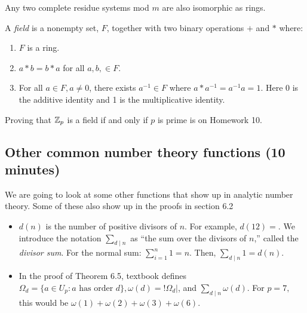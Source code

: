 \documentclass[letterpaper, 11 pt]{article}
\begin{document}
Any two complete residue systems mod $m$ are also isomorphic as rings.

\begin{defn}
 A \emph{field} is a nonempty set, $F$, together with two binary operations $+$ and $*$ where:
 
\begin{enumerate}
 \item $F$ is a ring.
 \item $a*b=b*a$ for all $a,b,\in F$. 
 \item For all $a\in F, a\neq 0$, there exists $a^{-1}\in F$ where $a*a^{-1}=a^{-1}a=1$. Here 0 is the additive identity and 1 is the multiplicative identity.
\end{enumerate}
 
\end{defn}

Proving that $\mathbb Z_p$ is a field if and only if $p$ is prime is on Homework 10.


\subsection{Other common number theory functions (10 minutes)}
We are going to look at some other functions that show up in analytic number theory. Some of these also show up in the proofs in section 6.2

\begin{itemize}
 \item $d(n)$ is the number of positive divisors of $n$. For example, $d(12)=  
 $. We introduce the notation $\displaystyle\sum_{d\mid n}$ as ``the sum over the divisors of $n$,'' called the \emph{divisor sum}. For the normal sum: $\displaystyle\sum_{i=1}^n 1= {n}
 $. Then, $\displaystyle\sum_{d\mid n}1= {d(n)}
$.
 
 \item In the proof of Theorem 6.5, textbook defines $\Omega_d=\{a\in U_p: a\textrm{ has order } d\}, \omega(d)=!\Omega_d|$, and $\displaystyle\sum_{d\mid n} \omega(d)$. For $p=7,$ this would be $\omega(1)+\omega(2)+\omega(3)+\omega(6).$
 
 
 
\end{itemize}
\end{document}
